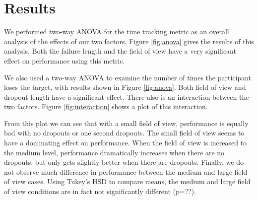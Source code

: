 \documentclass{acmsiggraph}                     %
\begin{document}


\section{Results}









We performed two-way {ANOVA} for the time tracking metric as an overall analysis of the effects of our two factors.  Figure \ref{fig:anova} gives the results of this analysis.  Both the failure length and the field of view have a very significant effect on performance using this metric.  

We also used a two-way {ANOVA} to examine the number of times the participant loses the target, with results shown in Figure \ref{fig:anova}.  Both field of view and dropout length have a significant effect.  There also is an interaction between the two factors.  Figure \ref{fig:interaction} shows a plot of this interaction.  

From this plot we can see that with a small field of view, performance is equally bad with no dropouts or one second dropouts.  The small field of view seems to have a dominating effect on performance.  When the field of view is increased to the medium level, performance dramatically increases when there are no dropouts, but only gets slightly better when there are dropouts.  Finally, we do not observe much difference in performance between the medium and large field of view cases.  Using Tukey's HSD to compare means, the medium and large field of view conditions are in fact not significantly different (p=??).
\end{document}
